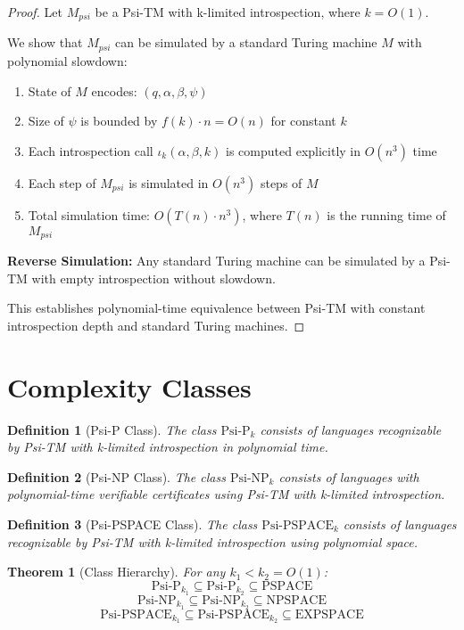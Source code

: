 \documentclass[11pt]{article}
\newtheorem{definition}{Definition}
\newtheorem{theorem}{Theorem}
\begin{document}
\begin{proof}
Let $M_{psi}$ be a Psi-TM with k-limited introspection, where $k = O(1)$.

We show that $M_{psi}$ can be simulated by a standard Turing machine $M$ with polynomial slowdown:

\begin{enumerate}
\item State of $M$ encodes: $(q, \alpha, \beta, \psi)$
\item Size of $\psi$ is bounded by $f(k) \cdot n = O(n)$ for constant $k$
\item Each introspection call $\iota_k(\alpha, \beta, k)$ is computed explicitly in $O(n^3)$ time
\item Each step of $M_{psi}$ is simulated in $O(n^3)$ steps of $M$
\item Total simulation time: $O(T(n) \cdot n^3)$, where $T(n)$ is the running time of $M_{psi}$
\end{enumerate}

\textbf{Reverse Simulation:}
Any standard Turing machine can be simulated by a Psi-TM with empty introspection without slowdown.

This establishes polynomial-time equivalence between Psi-TM with constant introspection depth and standard Turing machines.
\end{proof}

\section{Complexity Classes}

\begin{definition}[Psi-P Class]
The class $\text{Psi-P}_k$ consists of languages recognizable by Psi-TM with k-limited introspection in polynomial time.
\end{definition}

\begin{definition}[Psi-NP Class]
The class $\text{Psi-NP}_k$ consists of languages with polynomial-time verifiable certificates using Psi-TM with k-limited introspection.
\end{definition}

\begin{definition}[Psi-PSPACE Class]
The class $\text{Psi-PSPACE}_k$ consists of languages recognizable by Psi-TM with k-limited introspection using polynomial space.
\end{definition}

\begin{theorem}[Class Hierarchy]
For any $k_1 < k_2 = O(1)$:
$$\text{Psi-P}_{k_1} \subseteq \text{Psi-P}_{k_2} \subseteq \text{PSPACE}$$
$$\text{Psi-NP}_{k_1} \subseteq \text{Psi-NP}_{k_2} \subseteq \text{NPSPACE}$$
$$\text{Psi-PSPACE}_{k_1} \subseteq \text{Psi-PSPACE}_{k_2} \subseteq \text{EXPSPACE}$$
\end{theorem}
\end{document}
